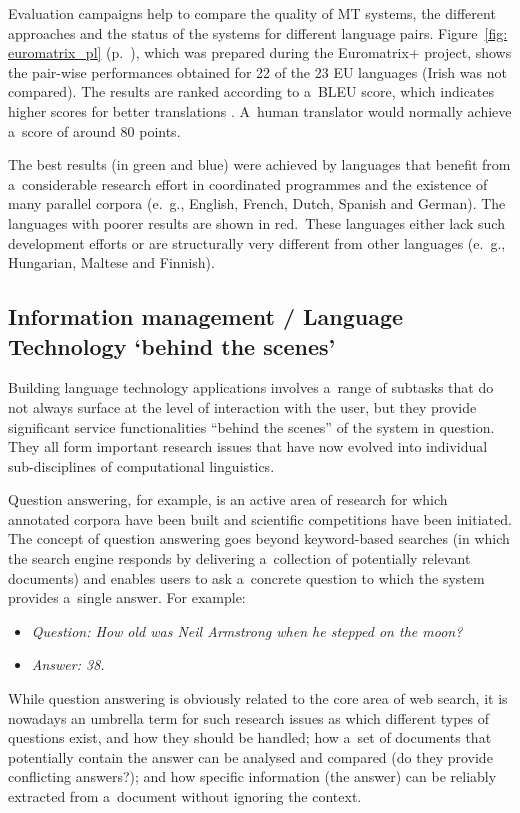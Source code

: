 \begin{multicols}{2}
Evaluation campaigns help to compare the quality of MT systems, the
different approaches and the status of the systems for different
language pairs. Figure~\ref{fig: euromatrix_pl} (p.~\pageref{fig:
euromatrix_pl}), which was prepared during the Euromatrix+ project,
shows the pair-wise performances obtained for 22 of the 23 EU
languages (Irish was not compared). The results are ranked according
to a~BLEU score, which indicates higher scores for better translations
\cite{bleu1}. A~human translator would normally achieve a~score of
around 80 points. 

The best results (in green and blue) were achieved by languages that
benefit from a~considerable research effort in coordinated programmes
and the existence of many parallel corpora (e.\, g., English, French,
Dutch, Spanish and German). The languages with poorer results are
shown in red.~These languages either lack such development efforts or
are structurally very different from other languages (e.\, g.,
Hungarian, Maltese and Finnish). 

\subsection{Information management / Language Technology ‘behind the
scenes’} 

Building language technology applications involves a~range of subtasks
that do not always surface at the level of interaction with the user,
but they provide significant service functionalities “behind the
scenes” of the system in question. They all form important research
issues that have now evolved into individual sub-disciplines of
computational linguistics. 

Question answering, for example, is an active area of research for
which annotated corpora have been built and scientific competitions
have been initiated. The concept of question answering goes beyond
keyword-based searches (in which the search engine responds by
delivering a~collection of potentially relevant documents) and enables
users to ask a~concrete question to which the system provides a~single
answer. For example: 

\begin{itemize} 
  \item[] \textit{Question: How old was Neil Armstrong
when he stepped on the moon?} 
  \item[] \textit{Answer: 38.}
\end{itemize} 

While question answering is obviously related to the core area of web
search, it is nowadays an umbrella term for such research issues as
which different types of questions exist, and how they should be
handled; how a~set of documents that potentially contain the answer
can be analysed and compared (do they provide conflicting answers?);
and how specific information (the answer) can be reliably extracted
from a~document without ignoring the context. 


\end{multicols}

